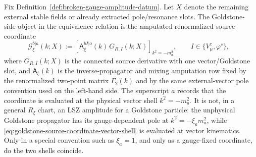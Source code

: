 \begin{definition}
\label{def:goldstone-source-coordinate-vector-shell}
Fix Definition~\ref{def:broken-gauge-amplitude-datum}.  Let \(X\) denote the
remaining external stable fields or already extracted pole/resonance slots.
The Goldstone-side object in the equivalence relation is the amputated
renormalized source coordinate
\begin{equation}
  \mathcal G_\xi^{b|a}(k;X)
  :=
  \left[
    \mathsf A_\xi^{bI|a}(k)\,
    G_{R,I}(k;X)
  \right]_{k^2=-m_a^2},
  \qquad I\in\{V_\mu^c,\varphi^c\},
  \label{eq:goldstone-source-coordinate-vector-shell}
\end{equation}
where \(G_{R,I}(k;X)\) is the connected source derivative with one
vector/Goldstone slot, and \(\mathsf A_\xi(k)\) is the inverse-propagator and
mixing amputation row fixed by the renormalized two-point matrix
\(\Gamma_2(k)\) and by the same external-vector pole convention used on the
left-hand side.  The superscript \(a\) records that the coordinate is evaluated
at the physical vector shell \(k^2=-m_a^2\).  It is not, in a general
\(R_\xi\) chart, an LSZ amplitude for a Goldstone particle: the unphysical
Goldstone propagator has its gauge-dependent pole at
\(k^2=-\xi_a m_a^2\), while
\eqref{eq:goldstone-source-coordinate-vector-shell} is evaluated at vector
kinematics.  Only in a special convention such as \(\xi_a=1\), and only as a
gauge-fixed coordinate, do the two shells coincide.
\end{definition}

